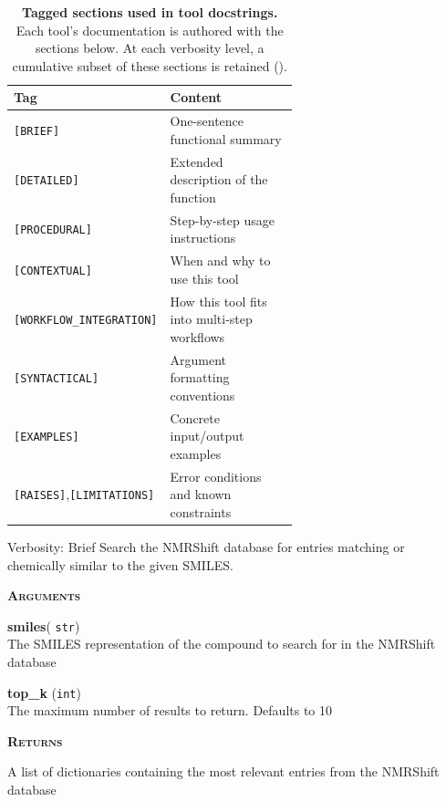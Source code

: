   \begin{table}[H]
  \centering
  \caption{\textbf{Tagged sections used in tool docstrings.} Each tool's documentation is authored with the sections below. At each verbosity level, a cumulative subset of these sections is retained ().}
  \label{tab:verbosity-tags}
  \renewcommand{\arraystretch}{1.15}
  \begin{tabular}{@{}lp{0.62\linewidth}@{}}
    \toprule
    \textbf{Tag} & \textbf{Content} \\
    \midrule
    \texttt{[BRIEF]}               & One-sentence functional summary \\
    \texttt{[DETAILED]}            & Extended description of the function \\
    \texttt{[PROCEDURAL]}          & Step-by-step usage instructions \\
    \texttt{[CONTEXTUAL]}          & When and why to use this tool \\
    \texttt{[WORKFLOW\_INTEGRATION]}& How this tool fits into multi-step workflows \\
    \texttt{[SYNTACTICAL]}         & Argument formatting conventions \\
    \texttt{[EXAMPLES]}            & Concrete input/output examples \\
    \texttt{[RAISES]},\;\texttt{[LIMITATIONS]} & Error conditions and known constraints \\
    \bottomrule
  \end{tabular}
  \end{table}


\begin{hypobox}{Verbosity: Brief}
  Search the NMRShift database for entries matching or chemically similar to the given SMILES.

  \medskip
\textbf{  \textsc{Arguments}}

  \textbf{smiles}( \texttt{str})\\
  \quad The SMILES representation of the compound to search for in the NMRShift database

  \textbf{top\_k} (\texttt{int})\\
  \quad The maximum number of results to return. Defaults to 10

  \medskip
\textbf{  \textsc{Returns}}

  \quad A list of dictionaries containing the most relevant entries from the NMRShift database
  \end{hypobox}


